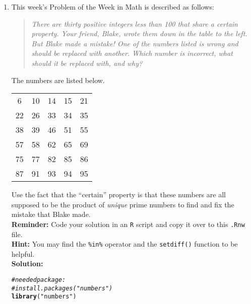\documentclass{article}\usepackage[]{graphicx}\usepackage[]{xcolor}
\makeatletter
\newcommand{\hlsng}[1]{\textcolor[rgb]{0.192,0.494,0.8}{#1}}%
\newcommand{\hlcom}[1]{\textcolor[rgb]{0.678,0.584,0.686}{\textit{#1}}}%
\newcommand{\hldef}[1]{\textcolor[rgb]{0.345,0.345,0.345}{#1}}%
\newcommand{\hlkwd}[1]{\textcolor[rgb]{0.737,0.353,0.396}{\textbf{#1}}}%
\newenvironment{kframe}{%
 \def\at@end@of@kframe{}%
 \ifinner\ifhmode%
  \def\at@end@of@kframe{\end{minipage}}%
  \begin{minipage}{\columnwidth}%
 \fi\fi%
 \def\FrameCommand##1{\hskip\@totalleftmargin \hskip-\fboxsep
 \colorbox{shadecolor}{##1}\hskip-\fboxsep
     \hskip-\linewidth \hskip-\@totalleftmargin \hskip\columnwidth}%
 \MakeFramed {\advance\hsize-\width
   \@totalleftmargin\z@ \linewidth\hsize
   \@setminipage}}%
 {\par\unskip\endMakeFramed%
 \at@end@of@kframe}
\newenvironment{knitrout}{}{} %
\makeatother
\begin{document}
\begin{enumerate}
\item This week's Problem of the Week in Math is described as follows:
\begin{quotation}
  \textit{There are thirty positive integers less than 100 that share a certain 
  property. Your friend, Blake, wrote them down in the table to the left. But 
  Blake made a mistake! One of the numbers listed is wrong and should be replaced 
  with another. Which number is incorrect, what should it be replaced with, and 
  why?}
\end{quotation}
The numbers are listed below.
\begin{center}
  \begin{tabular}{ccccc}
    6 & 10 & 14 & 15 & 21\\
    22 & 26 & 33 & 34 & 35\\
    38 & 39 & 46 & 51 & 55\\
    57 & 58 & 62 & 65 & 69\\
    75 & 77 & 82 & 85 & 86\\
    87 & 91 & 93 & 94 & 95
  \end{tabular}
\end{center}
Use the fact that the ``certain'' property is that these numbers are all supposed
to be the product of \emph{unique} prime numbers to find and fix the mistake that
Blake made.\\
\textbf{Reminder:} Code your solution in an \texttt{R} script and copy it over
to this \texttt{.Rnw} file.\\
\textbf{Hint:} You may find the \verb|%in%| operator and the \verb|setdiff()| function to be helpful.\\

\textbf{Solution:} 

\begin{knitrout}\scriptsize
{}\color{fgcolor}\begin{kframe}
\begin{alltt}
\hlcom{#needed package:}
\hlcom{#install.packages("numbers")}
\hlkwd{library}\hldef{(}\hlsng{"numbers"}\hldef{)}


\end{alltt}
\end{kframe}
\end{knitrout}
\end{enumerate}
\end{document}
